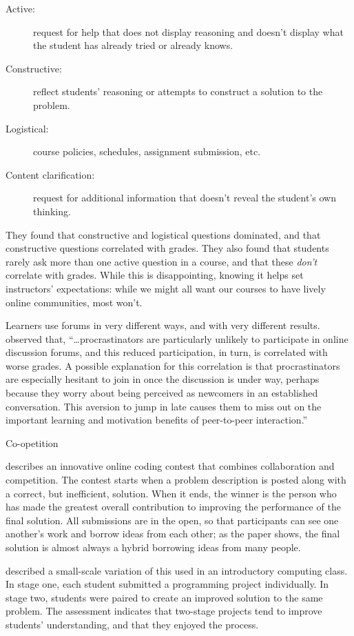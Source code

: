 \begin{description}

\item[Active:] request for help that does not display reasoning and
  doesn't display what the student has already tried or already knows.

\item[Constructive:] reflect students' reasoning or attempts to
  construct a solution to the problem.

\item[Logistical:] course policies, schedules, assignment submission,
  etc.

\item[Content clarification:] request for additional information that
  doesn't reveal the student's own thinking.

\end{description}

They found that constructive and logistical questions dominated, and
that constructive questions correlated with grades.  They also found
that students rarely ask more than one active question in a course,
and that these \emph{don't} correlate with grades.  While this is
disappointing, knowing it helps set instructors' expectations: while
we might all want our courses to have lively online communities, most
won't.

Learners use forums in very different ways, and with very different
results. \cite{Mill2016a} observed that, ``{\ldots}procrastinators are
particularly unlikely to participate in online discussion forums, and
this reduced participation, in turn, is correlated with worse
grades. A possible explanation for this correlation is that
procrastinators are especially hesitant to join in once the discussion
is under way, perhaps because they worry about being perceived as
newcomers in an established conversation. This aversion to jump in
late causes them to miss out on the important learning and motivation
benefits of peer-to-peer interaction.''

\begin{callout}{Co-opetition}

  \cite{Gull2004} describes an innovative online coding contest that
  combines collaboration and competition.  The contest starts when a
  problem description is posted along with a correct, but inefficient,
  solution.  When it ends, the winner is the person who has made the
  greatest overall contribution to improving the performance of the
  final solution. All submissions are in the open, so that
  participants can see one another's work and borrow ideas from each
  other; as the paper shows, the final solution is almost always a
  hybrid borrowing ideas from many people.

  \cite{Batt2018} described a small-scale variation of this used in an
  introductory computing class.  In stage one, each student submitted
  a programming project individually.  In stage two, students were
  paired to create an improved solution to the same problem.  The
  assessment indicates that two-stage projects tend to improve
  students' understanding, and that they enjoyed the process.

\end{callout}

